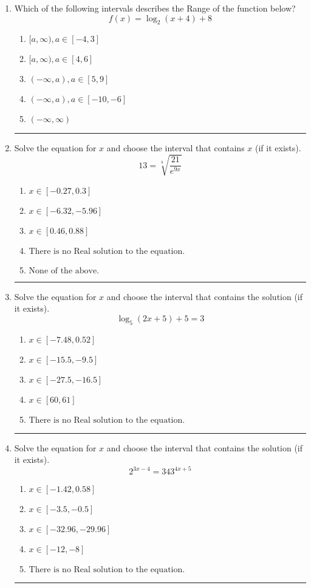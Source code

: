 \documentclass[14pt]{extbook}
\newcommand{\litem}[1]{\item#1\hspace*{-1cm}\rule{\textwidth}{0.4pt}}
\begin{document}
\begin{enumerate}
{\begin{enumerate}[label=\Alph*.]
\end{enumerate} }
\litem{
Which of the following intervals describes the Range of the function below?\[ f(x) = \log_2{(x+4)}+8 \]\begin{enumerate}[label=\Alph*.]
\item \( [a, \infty), a \in [-4, 3] \)
\item \( [a, \infty), a \in [4, 6] \)
\item \( (-\infty, a), a \in [5, 9] \)
\item \( (-\infty, a), a \in [-10, -6] \)
\item \( (-\infty, \infty) \)

\end{enumerate} }
\litem{
 Solve the equation for $x$ and choose the interval that contains $x$ (if it exists).\[  13 = \sqrt[4]{\frac{21}{e^{9x}}} \]\begin{enumerate}[label=\Alph*.]
\item \( x \in [-0.27, 0.3] \)
\item \( x \in [-6.32, -5.96] \)
\item \( x \in [0.46, 0.88] \)
\item \( \text{There is no Real solution to the equation.} \)
\item \( \text{None of the above.} \)

\end{enumerate} }
\litem{
Solve the equation for $x$ and choose the interval that contains the solution (if it exists).\[ \log_{5}{(2x+5)}+5 = 3 \]\begin{enumerate}[label=\Alph*.]
\item \( x \in [-7.48, 0.52] \)
\item \( x \in [-15.5, -9.5] \)
\item \( x \in [-27.5, -16.5] \)
\item \( x \in [60, 61] \)
\item \( \text{There is no Real solution to the equation.} \)

\end{enumerate} }
\litem{
Solve the equation for $x$ and choose the interval that contains the solution (if it exists).\[ 2^{3x-4} = 343^{4x+5} \]\begin{enumerate}[label=\Alph*.]
\item \( x \in [-1.42, 0.58] \)
\item \( x \in [-3.5, -0.5] \)
\item \( x \in [-32.96, -29.96] \)
\item \( x \in [-12, -8] \)
\item \( \text{There is no Real solution to the equation.} \)


\end{enumerate}}
\end{enumerate}
\end{document}
